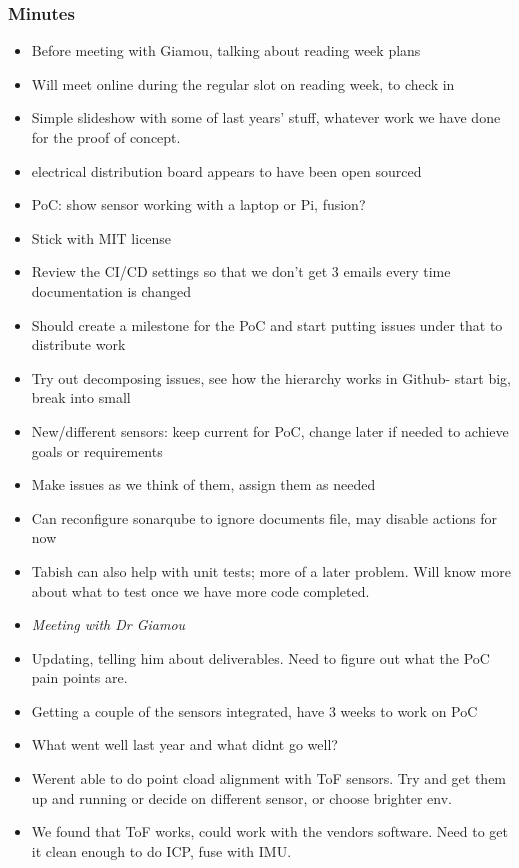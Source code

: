 		\subsubsection*{Minutes}
			\begin{itemize}
				\item Before meeting with Giamou, talking about reading week plans
				\item Will meet online during the regular slot on reading week, to check in
				\item Simple slideshow with some of last years' stuff, whatever work we have done for the proof of concept.
				\item electrical distribution board appears to have been open sourced
				\item PoC: show sensor working with a laptop or Pi, fusion?
				\item Stick with MIT license
				\item Review the CI/CD settings so that we don't get 3 emails every time documentation is changed
				\item Should create a milestone for the PoC and start putting issues under that to distribute work
				\item Try out decomposing issues, see how the hierarchy works in Github- start big, break into small
				\item New/different sensors: keep current for PoC, change later if needed to achieve goals or requirements
				\item Make issues as we think of them, assign them as needed
				\item Can reconfigure sonarqube to ignore documents file, may disable actions for now
				\item Tabish can also help with unit tests; more of a later problem. Will know more about what to test once we have more code completed.
				\item \textit{Meeting with Dr Giamou}
				\item Updating, telling him about deliverables. Need to figure out what the PoC pain points are.
				\item Getting a couple of the sensors integrated, have 3 weeks to work on PoC
				\item What went well last year and what didnt go well?
				\item Werent able to do point cload alignment with ToF sensors. Try and get them up and running or decide on different sensor, or choose brighter env.
				\item We found that ToF works, could work with the vendors software. Need to get it clean enough to do ICP, fuse with IMU.

\end{itemize}

